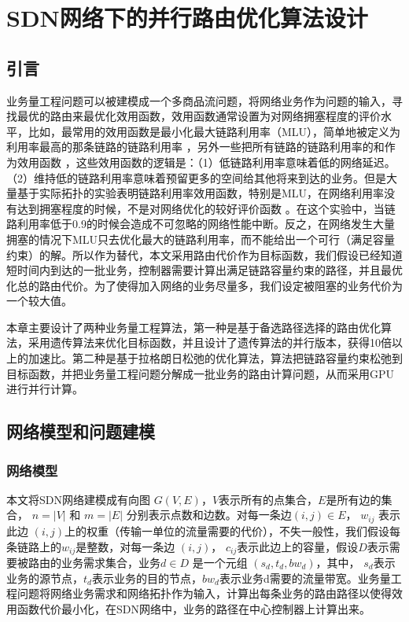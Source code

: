 \chapter{SDN网络下的并行路由优化算法设计}
\section{引言}
业务量工程问题可以被建模成一个多商品流问题，将网络业务作为问题的输入，寻找最优的路由来最优化效用函数，效用函数通常设置为对网络拥塞程度的评价水平，比如，最常用的效用函数是最小化最大链路利用率（MLU），简单地被定义为利用率最高的那条链路的链路利用率 ，另外一些把所有链路的链路利用率的和作为效用函数 ，这些效用函数的逻辑是：（1）低链路利用率意味着低的网络延迟。（2）维持低的链路利用率意味着预留更多的空间给其他将来到达的业务。但是大量基于实际拓扑的实验表明链路利用率效用函数，特别是MLU，在网络利用率没有达到拥塞程度的时候，不是对网络优化的较好评价函数 。在这个实验中，当链路利用率低于0.9的时候会造成不可忽略的网络性能中断。反之，在网络发生大量拥塞的情况下MLU只去优化最大的链路利用率，而不能给出一个可行（满足容量约束）的解。所以作为替代，本文采用路由代价作为目标函数，我们假设已经知道短时间内到达的一批业务，控制器需要计算出满足链路容量约束的路径，并且最优化总的路由代价。为了使得加入网络的业务尽量多，我们设定被阻塞的业务代价为一个较大值。

本章主要设计了两种业务量工程算法，第一种是基于备选路径选择的路由优化算法，采用遗传算法来优化目标函数，并且设计了遗传算法的并行版本，获得10倍以上的加速比。第二种是基于拉格朗日松弛的优化算法，算法把链路容量约束松弛到目标函数，并把业务量工程问题分解成一批业务的路由计算问题，从而采用GPU进行并行计算。
\section{网络模型和问题建模}
\subsection{网络模型}

本文将SDN网络建模成有向图 $G(V, E)$，$V$表示所有的点集合，$E$是所有边的集合， $n = |V|$ 和 $m = |E|$ 分别表示点数和边数。对每一条边$(i,j)\in E$， $w_{ij}$ 表示此边 $(i,j)$上的权重（传输一单位的流量需要的代价），不失一般性，我们假设每条链路上的$w_{ij}$是整数，对每一条边 $(i,j)$， $c_{ij}$表示此边上的容量，假设$D$表示需要被路由的业务需求集合，业务$d \in D$ 是一个元组 $(s_d, t_d, bw_d)$，其中， $s_d$表示业务的源节点，$t_d$表示业务的目的节点，$bw_d$表示业务d需要的流量带宽。业务量工程问题将网络业务需求和网络拓扑作为输入，计算出每条业务的路由路径以使得效用函数代价最小化，在SDN网络中，业务的路径在中心控制器上计算出来。

